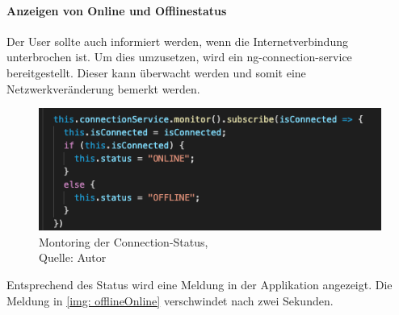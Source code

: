 \paragraph{Anzeigen von Online und Offlinestatus}
Der User sollte auch informiert werden, wenn die Internetverbindung unterbrochen ist. Um dies umzusetzen, wird ein ng-connection-service bereitgestellt. Dieser kann überwacht werden und somit eine Netzwerkveränderung bemerkt werden. 
\begin{figure}[H]
	\centering
	\includegraphics[scale=0.6]{images/connectionService.PNG}
	\caption[Montoring der Connection-Status]{Montoring der Connection-Status,\\ Quelle: Autor}
	\label{img: connectionState}
\end{figure} 
Entsprechend des Status wird eine Meldung in der Applikation angezeigt. Die Meldung in \ref{img: offlineOnline} verschwindet nach zwei Sekunden. 
